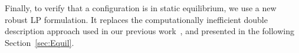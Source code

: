 Finally, to verify that a configuration is in static equilibrium, we use a new robust LP formulation. It replaces the computationally inefficient double description
approach used in our previous work~\cite{tonneauisrr15}, and presented in the following Section~\ref{sec:Equil}.





